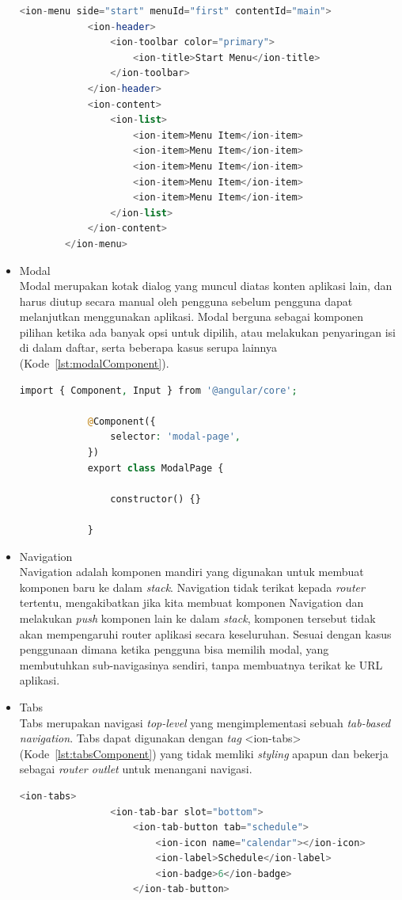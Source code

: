 \begin{itemize}
	\begin{lstlisting}[language=php, label={lst:menuComponent}, caption=Potongan Kode Program dari Menu Component]
		<ion-menu side="start" menuId="first" contentId="main">
			<ion-header>
				<ion-toolbar color="primary">
					<ion-title>Start Menu</ion-title>
				</ion-toolbar>
			</ion-header>
			<ion-content>
				<ion-list>
					<ion-item>Menu Item</ion-item>
					<ion-item>Menu Item</ion-item>
					<ion-item>Menu Item</ion-item>
					<ion-item>Menu Item</ion-item>
					<ion-item>Menu Item</ion-item>
				</ion-list>
			</ion-content>
		</ion-menu>
	\end{lstlisting} 
	\item Modal \\
	Modal merupakan kotak dialog yang muncul diatas konten aplikasi lain, dan harus diutup secara manual oleh pengguna sebelum pengguna dapat melanjutkan menggunakan aplikasi. Modal berguna sebagai komponen pilihan ketika ada banyak opsi untuk dipilih, atau melakukan penyaringan isi di dalam daftar, serta beberapa kasus serupa lainnya (Kode~\ref{lst:modalComponent}).
		\begin{lstlisting}[language=php, label={lst:modalComponent}, caption=Kode Program dari Modal]
			import { Component, Input } from '@angular/core';

			@Component({
			  	selector: 'modal-page',
			})
			export class ModalPage {
			
			  	constructor() {}
			
			}
		\end{lstlisting} 
	\item Navigation \\
	Navigation adalah komponen mandiri yang digunakan untuk membuat komponen baru ke dalam {\it stack}. Navigation tidak terikat kepada {\it router} tertentu, mengakibatkan jika kita membuat komponen Navigation dan melakukan {\it push} komponen lain ke dalam {\it stack}, komponen tersebut tidak akan mempengaruhi router aplikasi secara keseluruhan. Sesuai dengan kasus penggunaan dimana ketika pengguna bisa memilih modal, yang membutuhkan sub-navigasinya sendiri, tanpa membuatnya terikat ke URL aplikasi. 
	\item Tabs \\
	Tabs merupakan navigasi {\it top-level} yang mengimplementasi sebuah {\it tab-based navigation}. Tabs dapat digunakan dengan {\it tag} <ion-tabs> (Kode~\ref{lst:tabsComponent}) yang tidak memliki {\it styling} apapun dan bekerja sebagai {\it router outlet} untuk menangani navigasi. 
		\begin{lstlisting}[language=php, label={lst:tabsComponent}, caption=Kode Program dari Tabs]
			<ion-tabs>
				<ion-tab-bar slot="bottom">
					<ion-tab-button tab="schedule">
						<ion-icon name="calendar"></ion-icon>
						<ion-label>Schedule</ion-label>
						<ion-badge>6</ion-badge>
					</ion-tab-button>
				

\end{lstlisting}
\end{itemize}
